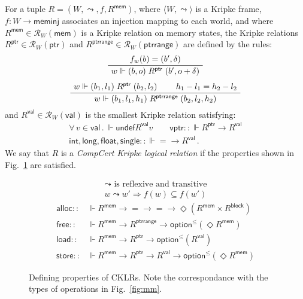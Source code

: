 \documentclass[acmsmall,screen,review,anonymous]{acmart}
\newcommand{\kw}[1]{\ensuremath{ \mathsf{#1} }}
\begin{document}
\begin{definition} \label{def:cklr} %
For a tuple $R = (W, \leadsto, f, R^\kw{mem})$,
where
$\langle W, \leadsto \rangle$ is a Kripke frame,
$f : W \rightarrow \kw{meminj}$
associates an injection mapping to each world, and where
$R^\kw{mem} \in \mathcal{R}_{W}(\kw{mem})$
is a Kripke relation on memory states,
the Kripke relations
$R^\kw{ptr} \in \mathcal{R}_W(\kw{ptr})$ and
$R^\kw{ptrrange} \in \mathcal{R}_W(\kw{ptrrange})$
are defined by the rules:
\begin{gather*}
  \AxiomC{$f_w(b) = (b', \delta)$}
  \UnaryInfC{$w \Vdash (b, o) \mathrel{R^\kw{ptr}} (b', o + \delta)$}
  \DisplayProof
  \\[1ex]
  \AxiomC{$w \Vdash (b_1, l_1) \mathrel{R^\kw{ptr}} (b_2, l_2)$}
  \AxiomC{$h_1 - l_1 = h_2 - l_2$}
  \BinaryInfC{$w \Vdash (b_1, l_1, h_1) \mathrel{R^\kw{ptrrange}} (b_2, l_2, h_2)$}
  \DisplayProof
\end{gather*}
and
$R^\kw{val} \in \mathcal{R}_W(\kw{val})$
is the smallest Kripke relation satisfying:
\begin{gather*}
  \forall \, v \in \kw{val} \,.\,
    \Vdash \kw{undef} \mathrel{R^\kw{val}} v \qquad
  \kw{vptr} :: {\Vdash R^\kw{ptr} \rightarrow R^\kw{val}} \\
  \kw{int}, \kw{long}, \kw{float}, \kw{single} ::
    {\Vdash {=} \rightarrow R^\kw{val}} \,.
\end{gather*}
We say that $R$ is a \emph{CompCert Kripke logical relation}
if the properties shown in Fig.~\ref{fig:cklr-def} are satisfied.
\end{definition}

\begin{figure} %
  \begin{gather*}
    {\leadsto} \mbox{ is reflexive and transitive} \\
    w \leadsto w' \Rightarrow f(w) \subseteq f(w')
  \end{gather*}
  \begin{align*}
      \kw{alloc} ::
        &\Vdash R^\kw{mem} \rightarrow {=} \rightarrow {=} \rightarrow
        \Diamond (R^\kw{mem} \times R^\kw{block})
      \\
      \kw{free} ::
        &\Vdash R^\kw{mem} \rightarrow R^\kw{ptrrange} \rightarrow
        \kw{option}^\le(\Diamond R^\kw{mem})
      \\
      \kw{load} ::
        &\Vdash R^\kw{mem} \rightarrow R^\kw{ptr} \rightarrow
        \kw{option}^\le(R^\kw{val})
      \\
      \kw{store} ::
        &\Vdash R^\kw{mem} \rightarrow R^\kw{ptr} \rightarrow R^\kw{val} \rightarrow
        \kw{option}^\le(\Diamond R^\kw{mem})
  \end{align*}
  \caption{Defining properties of CKLRs.
    Note the correspondance with
    the types of operations in Fig.~\ref{fig:mm}.}
  \label{fig:cklr-def}
\end{figure}
\end{document}
